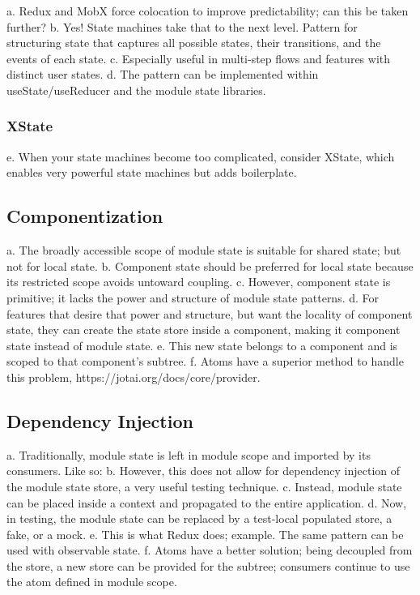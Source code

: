 \documentclass{article}
\begin{document}
a. Redux and MobX force colocation to improve predictability; can this be taken further?
b. Yes! State machines take that to the next level. Pattern for structuring state that captures all possible states, their transitions, and the events of each state.
c. Especially useful in multi-step flows and features with distinct user states.
d. The pattern can be implemented within useState/useReducer and the module state libraries.

\subsubsection{XState}

e. When your state machines become too complicated, consider XState, which enables very powerful state machines but adds boilerplate.

\subsection{Componentization}

a. The broadly accessible scope of module state is suitable for shared state; but not for local state.
b. Component state should be preferred for local state because its restricted scope avoids untoward coupling.
c. However, component state is primitive; it lacks the power and structure of module state patterns.
d. For features that desire that power and structure, but want the locality of component state, they can create the state store inside a component, making it component state instead of module state.
e. This new state belongs to a component and is scoped to that component's subtree.
f. Atoms have a superior method to handle this problem, https://jotai.org/docs/core/provider.

\subsection{Dependency Injection}

a. Traditionally, module state is left in module scope and imported by its consumers. Like so:
b. However, this does not allow for dependency injection of the module state store, a very useful testing technique.
c. Instead, module state can be placed inside a context and propagated to the entire application.
d. Now, in testing, the module state can be replaced by a test-local populated store, a fake, or a mock.
e. This is what Redux does; example. The same pattern can be used with observable state.
f. Atoms have a better solution; being decoupled from the store, a new store can be provided for the subtree; consumers continue to use the atom defined in module scope.
\end{document}
